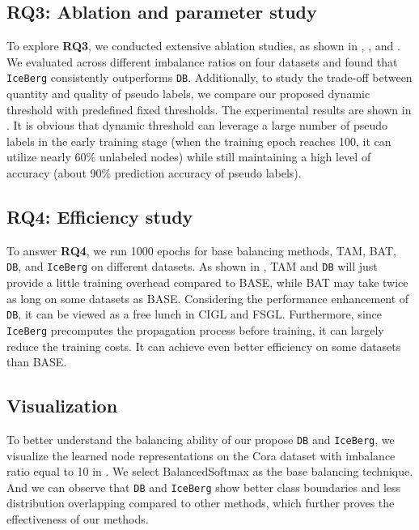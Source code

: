 \subsection{RQ3: Ablation and parameter study}

To explore \textbf{RQ3}, we conducted extensive ablation studies, as shown in , , and . We evaluated across different imbalance ratios on four datasets and found that \texttt{IceBerg} consistently outperforms \texttt{DB}. Additionally, to study the trade-off between quantity and quality of pseudo labels, we compare our proposed dynamic threshold with predefined fixed thresholds. The experimental results are shown in . It is obvious that dynamic threshold can leverage a large number of pseudo labels in the early training stage (when the training epoch reaches 100, it can utilize nearly 60\% unlabeled nodes) while still maintaining a high level of accuracy (about 90\% prediction accuracy of pseudo labels).

\subsection{RQ4: Efficiency study}


To answer \textbf{RQ4}, we run 1000 epochs for base balancing methods, TAM, BAT, \texttt{DB}, and \texttt{IceBerg} on different datasets. As shown in , TAM and \texttt{DB} will just provide a little training overhead compared to BASE, while BAT may take twice as long on some datasets as BASE. Considering the performance enhancement of \texttt{DB}, it can be viewed as a free lunch in CIGL and FSGL. Furthermore, since \texttt{IceBerg} precomputes the propagation process before training, it can largely reduce the training costs. It can achieve even better efficiency on some datasets than BASE.

\subsection{Visualization}

To better understand the balancing ability of our propose \texttt{DB} and \texttt{IceBerg}, we visualize the learned node representations on the Cora dataset with imbalance ratio equal to 10 in . We select BalancedSoftmax as the base balancing technique. And we can observe that \texttt{DB} and \texttt{IceBerg} show better class boundaries and less distribution overlapping compared to other methods, which further proves the effectiveness of our methods.


